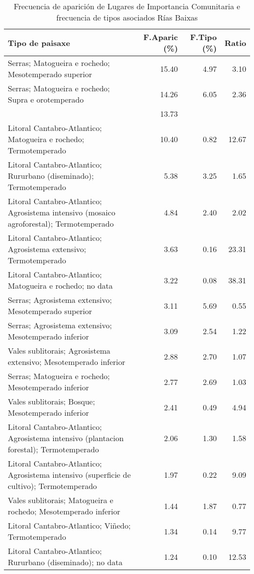 \begin{table}[p]
\centering
\caption{Frecuencia de aparición de Lugares de Importancia Comunitaria e frecuencia de tipos asociados Rías Baixas} 
\label{vnatura12}
\begin{tabular}{lrrr}
  \hline
Tipo de paisaxe & F.Aparic (\%) & F.Tipo (\%) & Ratio \\ 
  \hline
Serras; Matogueira e rochedo; Mesotemperado superior & 15.40 & 4.97 & 3.10 \\ 
  Serras; Matogueira e rochedo; Supra e orotemperado & 14.26 & 6.05 & 2.36 \\ 
   & 13.73 &  &  \\ 
  Litoral Cantabro-Atlantico; Matogueira e rochedo; Termotemperado & 10.40 & 0.82 & 12.67 \\ 
  Litoral Cantabro-Atlantico; Rururbano (diseminado); Termotemperado & 5.38 & 3.25 & 1.65 \\ 
  Litoral Cantabro-Atlantico; Agrosistema intensivo (mosaico agroforestal); Termotemperado & 4.84 & 2.40 & 2.02 \\ 
  Litoral Cantabro-Atlantico; Agrosistema extensivo; Termotemperado & 3.63 & 0.16 & 23.31 \\ 
  Litoral Cantabro-Atlantico; Matogueira e rochedo; no data & 3.22 & 0.08 & 38.31 \\ 
  Serras; Agrosistema extensivo; Mesotemperado superior & 3.11 & 5.69 & 0.55 \\ 
  Serras; Agrosistema extensivo; Mesotemperado inferior & 3.09 & 2.54 & 1.22 \\ 
  Vales sublitorais; Agrosistema extensivo; Mesotemperado inferior & 2.88 & 2.70 & 1.07 \\ 
  Serras; Matogueira e rochedo; Mesotemperado inferior & 2.77 & 2.69 & 1.03 \\ 
  Vales sublitorais; Bosque; Mesotemperado inferior & 2.41 & 0.49 & 4.94 \\ 
  Litoral Cantabro-Atlantico; Agrosistema intensivo (plantacion forestal); Termotemperado & 2.06 & 1.30 & 1.58 \\ 
  Litoral Cantabro-Atlantico; Agrosistema intensivo (superficie de cultivo); Termotemperado & 1.97 & 0.22 & 9.09 \\ 
  Vales sublitorais; Matogueira e rochedo; Mesotemperado inferior & 1.44 & 1.87 & 0.77 \\ 
  Litoral Cantabro-Atlantico; Viñedo; Termotemperado & 1.34 & 0.14 & 9.77 \\ 
  Litoral Cantabro-Atlantico; Rururbano (diseminado); no data & 1.24 & 0.10 & 12.53 \\ 
   \hline
\end{tabular}
\end{table}
